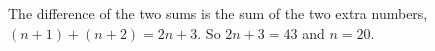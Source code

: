The difference of the two sums is the sum of the two extra numbers, $(n+1)+(n+2)=2n+3$. So $2n+3=43$ and $n=\boxed{20}$.
